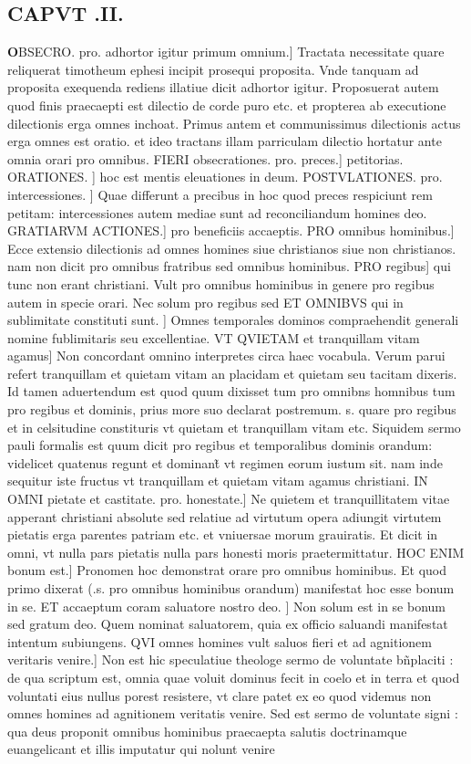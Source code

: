 \documentclass{article}
\begin{document}
\begin{pages}
\section{CAPVT .II.}\pstart \huge\textbf{O}\normalsize BSECRO. pro. adhortor  igitur primum omnium.] Tractata necessitate quare reliquerat timotheum ephesi  incipit prosequi proposita. Vnde tanquam ad proposita exequenda rediens  illatiue dicit adhortor igitur. Proposuerat autem quod finis praecaepti est dilectio de corde puro etc.  et propterea ab executione dilectionis erga omnes inchoat. Primus antem et communissimus dilectionis actus erga omnes est oratio. et ideo tractans illam parriculam dilectio  hortatur ante omnia orari pro omnibus. FIERI obsecrationes. pro. preces.] petitorias. ORATIONES. ] hoc est mentis eleuationes in deum. POSTVLATIONES. pro. intercessiones. ] Quae differunt a precibus in hoc quod preces respiciunt rem petitam: intercessiones autem mediae sunt ad reconciliandum homines deo. GRATIARVM ACTIONES.] pro beneficiis accaeptis. PRO omnibus hominibus.] Ecce extensio dilectionis ad omnes homines siue christianos siue non christianos. nam non dicit pro omnibus fratribus sed omnibus hominibus. PRO regibus] qui tunc non erant christiani. Vult pro omnibus hominibus in genere  pro regibus autem in specie orari. Nec solum pro regibus sed ET OMNIBVS qui in sublimitate constituti sunt. ] Omnes temporales dominos compraehendit  generali nomine fublimitaris seu excellentiae. VT QVIETAM et tranquillam vitam agamus] Non concordant omnino interpretes circa haec vocabula. Verum parui refert tranquillam et quietam vitam an placidam et quietam seu tacitam dixeris. Id tamen aduertendum est quod quum dixisset tum pro omnibns homnibus tum pro regibus et dominis, prius more suo declarat postremum. s. quare pro regibus et in celsitudine constituris  vt quietam et tranquillam vitam etc.  Siquidem sermo pauli formalis est  quum dicit pro regibus et temporalibus dominis orandum: videlicet quatenus regunt et dominant̃ vt regimen eorum iustum sit. nam inde sequitur iste fructus vt tranquillam et quietam vitam agamus christiani. IN OMNI pietate et castitate. pro. honestate.] Ne quietem et tranquillitatem vitae apperant christiani absolute sed relatiue ad virtutum opera  adiungit virtutem pietatis erga parentes patriam etc.  et vniuersae morum grauiratis. Et dicit in omni, vt nulla pars pietatis  nulla pars honesti moris praetermittatur.  \pend\pstart HOC ENIM bonum est.] Pronomen hoc demonstrat orare pro omnibus hominibus. Et quod primo dixerat (.s. pro omnibus hominibus orandum) manifestat hoc esse bonum in se. ET accaeptum coram saluatore nostro deo. ] Non solum est in se bonum sed gratum deo. Quem nominat saluatorem, quia ex officio saluandi manifestat intentum  subiungens. QVI omnes homines vult saluos fieri et ad agnitionem veritaris venire.] Non est hic speculatiue theologe sermo de voluntate bñplaciti : de qua scriptum est, omnia quae voluit dominus fecit in coelo et in terra et quod voluntati eius nullus porest resistere, vt clare patet ex eo quod videmus non omnes homines ad agnitionem veritatis venire. Sed est sermo de voluntate signi : qua deus proponit omnibus hominibus praecaepta salutis doctrinamque  euangelicant et illis imputatur qui nolunt venire 
\end{pages}
\end{document}
